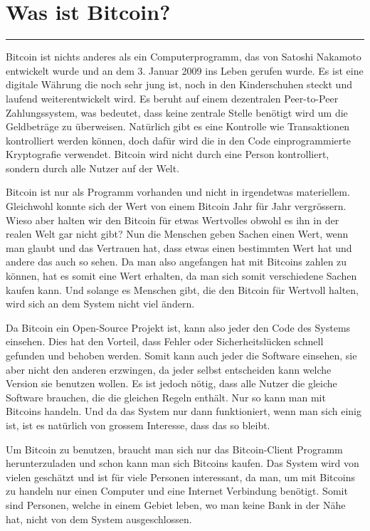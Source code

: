 \section*{Was ist Bitcoin?}
\vspace{-10mm}
\noindent\rule{0.8\textwidth}{0.4pt}

\vspace{5mm}
\noindent
Bitcoin ist nichts anderes als ein Computerprogramm, das von Satoshi Nakamoto entwickelt wurde und an dem 3. Januar 2009 ins Leben gerufen wurde.
Es ist eine digitale Währung die noch sehr jung ist, noch in den Kinderschuhen steckt und laufend weiterentwickelt wird.
Es beruht auf einem dezentralen Peer-to-Peer Zahlungssystem, was bedeutet, dass keine zentrale Stelle benötigt wird um die Geldbeträge zu überweisen.
Natürlich gibt es eine Kontrolle wie Transaktionen kontrolliert werden können, doch dafür wird die in den Code einprogrammierte Kryptografie verwendet.
Bitcoin wird nicht durch eine Person kontrolliert, sondern durch alle Nutzer auf der Welt.

\noindent
Bitcoin ist nur als Programm vorhanden und nicht in irgendetwas materiellem. Gleichwohl konnte sich der Wert von einem Bitcoin Jahr für Jahr vergrössern.
Wieso aber halten wir den Bitcoin für etwas Wertvolles obwohl es ihn in der realen Welt gar nicht gibt? Nun die Menschen geben Sachen einen Wert, wenn
man glaubt und das Vertrauen hat, dass etwas einen bestimmten Wert hat und andere das auch so sehen. Da man also angefangen hat mit Bitcoins zahlen zu können,
hat es somit eine Wert erhalten, da man sich somit verschiedene Sachen kaufen kann. Und solange es Menschen gibt, die den Bitcoin für Wertvoll halten, wird sich
an dem System nicht viel ändern.

\noindent
Da Bitcoin ein Open-Source Projekt ist, kann also jeder den Code des Systems einsehen. Dies hat den Vorteil, dass Fehler oder Sicherheitslücken schnell
gefunden und behoben werden. Somit kann auch jeder die Software einsehen, sie aber nicht den anderen erzwingen, da jeder selbst entscheiden kann welche
Version sie benutzen wollen. Es ist jedoch nötig, dass alle Nutzer die gleiche Software brauchen, die die gleichen Regeln enthält. Nur so kann man mit
Bitcoins handeln. Und da das System nur dann funktioniert, wenn man sich einig ist, ist es natürlich von grossem Interesse, dass das so bleibt.

\noindent
Um Bitcoin zu benutzen, braucht man sich nur das Bitcoin-Client Programm herunterzuladen und schon kann man sich Bitcoins kaufen. Das System wird von
vielen geschätzt und ist für viele Personen interessant, da man, um mit Bitcoins zu handeln nur einen Computer und eine Internet Verbindung benötigt.
Somit sind Personen, welche in einem Gebiet leben, wo man keine Bank in der Nähe hat, nicht von dem System ausgeschlossen.


